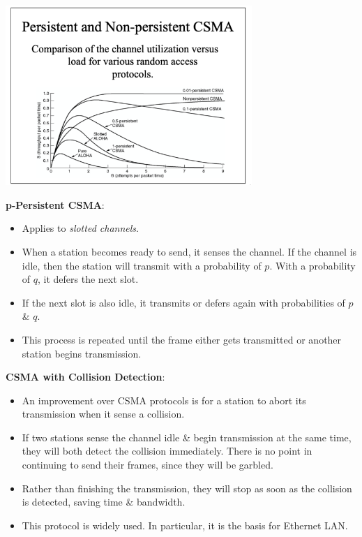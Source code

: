 \documentclass[11pt]{article}
\begin{document}
\begin{center}
    \includegraphics[width=0.7\textwidth]{persistentandnonpersistentcsma.png}
\end{center}

\textbf{p-Persistent CSMA}:
\begin{itemize}
    \item   Applies to \textit{slotted channels}. 
    \item   When a station becomes ready to send, it senses the channel. 
            If the channel is idle, then the station will transmit with a probability of $p$. 
            With a probability of $q$, it defers the next slot. 
    \item   If the next slot is also idle, it transmits or defers again with probabilities of $p$ \& $q$. 
    \item   This process is repeated until the frame either gets transmitted or another station begins 
            transmission. 
\end{itemize}

\textbf{CSMA with Collision Detection}:
\begin{itemize}
    \item   An improvement over CSMA protocols is for a station to abort its transmission when it sense a 
            collision. 
    \item   If two stations sense the channel idle \& begin transmission at the same time, they will both 
            detect the collision immediately. 
            There is no point in continuing to send their frames, since they will be garbled. 
    \item   Rather than finishing the transmission, they will stop as soon as the collision is detected, 
            saving time \& bandwidth.
    \item   This protocol is widely used. In particular, it is the basis for Ethernet LAN.
\end{itemize}
\end{document}
